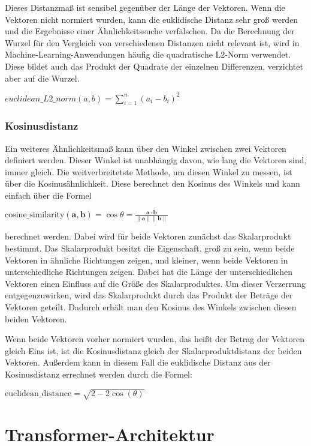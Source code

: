 Dieses Distanzmaß ist sensibel gegenüber der Länge der Vektoren.
Wenn die Vektoren nicht normiert wurden, kann die euklidische Distanz sehr groß werden und die Ergebnisse einer Ähnlichkeitssuche verfälschen.
Da die Berechnung der Wurzel für den Vergleich von verschiedenen Distanzen nicht relevant ist, wird in Machine-Learning-Anwendungen häufig die quadratische L2-Norm verwendet.
Diese bildet auch das Produkt der Quadrate der einzelnen Differenzen, verzichtet aber auf die Wurzel.

$euclidean\_L2\_norm(a,b) = \sum_{i=1}^{n} (a_i-b_i)^2$


\subsubsection{Kosinusdistanz}

Ein weiteres Ähnlichkeitsmaß kann über den Winkel zwischen zwei Vektoren definiert werden.
Dieser Winkel ist unabhängig davon, wie lang die Vektoren sind, immer gleich.
Die weitverbreitetste Methode, um diesen Winkel zu messen, ist über die Kosinusähnlichkeit.
Diese berechnet den Kosinus des Winkels und kann einfach über die Formel

$\text{cosine\_similarity}(\mathbf{a}, \mathbf{b}) = \cos{\theta} = \frac{\mathbf{a} \cdot \mathbf{b}}{\|\mathbf{a}\| \|\mathbf{b}\|}$

berechnet werden.
Dabei wird für beide Vektoren zunächst das Skalarprodukt bestimmt.
Das Skalarprodukt besitzt die Eigenschaft, groß zu sein, wenn beide Vektoren in ähnliche Richtungen zeigen, und kleiner, wenn beide Vektoren in unterschiedliche Richtungen zeigen.
Dabei hat die Länge der unterschiedlichen Vektoren einen Einfluss auf die Größe des Skalarproduktes.
Um dieser Verzerrung entgegenzuwirken, wird das Skalarprodukt durch das Produkt der Beträge der Vektoren geteilt.
Dadurch erhält man den Kosinus des Winkels zwischen diesen beiden Vektoren.

Wenn beide Vektoren vorher normiert wurden, das heißt der Betrag der Vektoren gleich Eins ist, ist die Kosinusdistanz gleich der Skalarproduktdistanz der beiden Vektoren.
Außerdem kann in diesem Fall die euklidische Distanz aus der Kosinusdistanz errechnet werden durch die Formel:

$\text{euclidean\_distance} = \sqrt{2 - 2 \cos(\theta)}$
\section{Transformer-Architektur}

